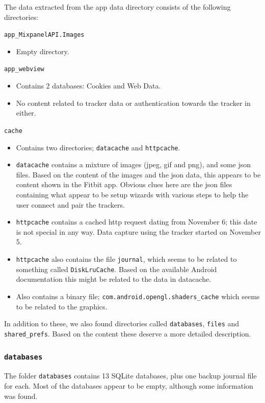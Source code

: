 \documentclass[a4paper,11pt,dvips]{article}
\begin{document}
The data extracted from the app data directory consists of the following directories:

\vspace{1em}
\noindent
\texttt{app\_MixpanelAPI.Images}
\begin{itemize}
\item Empty directory.
\end{itemize}

\noindent
\texttt{app\_webview}
\begin{itemize}
\item Contains 2 databases: Cookies and Web Data.
\item No content related to tracker data or authentication towards the tracker in either.
\end{itemize}

\noindent
\texttt{cache}
\begin{itemize}
\item Contains two directories; \texttt{datacache} and \texttt{httpcache}.
\item \texttt{datacache} contains a mixture of images (jpeg, gif and png), and some json files. Based on the content of the images and the json data, this appears to be content shown in the Fitbit app. Obvious clues here are the json files containing what appear to be setup wizards with various steps to help the user connect and pair the trackers.
\item \texttt{httpcache} contains a cached http request dating from November 6; this date is not special in any way. Data capture using the tracker started on November 5.
\item \texttt{httpcache} also contains the file \texttt{journal}, which seems to be related to something called \texttt{DiskLruCache}. Based on the available Android documentation this might be related to the data in datacache.
\item Also contains a binary file; \texttt{com.android.opengl.shaders\_cache} which seems to be related to the graphics.
\end{itemize}

\noindent
In addition to these, we also found directories called \texttt{databases}, \texttt{files} and \texttt{shared\_prefs}. Based on the content these deserve a more detailed description.

\subsubsection{\texttt{databases}}
The folder \texttt{databases} contains 13 SQLite databases, plus one backup journal file for each. Most of the databases appear to be empty, although some information was found.
\end{document}
